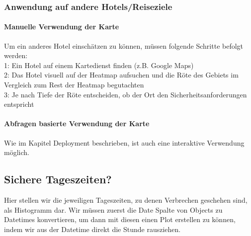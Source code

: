 \documentclass[10pt]{article}
\begin{document}
\subsubsection{Anwendung auf andere
Hotels/Reiseziele}\label{anwendung-auf-andere-hotelsreiseziele}

\paragraph{Manuelle Verwendung der
Karte}\label{manuelle-verwendung-der-karte}

Um ein anderes Hotel einschätzen zu können, müssen folgende Schritte
befolgt werden:\\
1: Ein Hotel auf einem Kartedienst finden (z.B. Google Maps)\\
2: Das Hotel visuell auf der Heatmap aufsuchen und die Röte des Gebiets
im Vergleich zum Rest der Heatmap begutachten\\
3: Je nach Tiefe der Röte entscheiden, ob der Ort den
Sicherheitsanforderungen entspricht

\paragraph{Abfragen basierte Verwendung der
Karte}\label{abfragen-basierte-verwendung-der-karte}

Wie im Kapitel Deployment beschrieben, ist auch eine interaktive
Verwendung möglich.

    \subsection{Sichere Tageszeiten?}\label{sichere-tageszeiten}

    Hier stellen wir die jeweiligen Tageszeiten, zu denen Verbrechen
geschehen sind, als Histogramm dar. Wir müssen zuerst die Date Spalte
von Objects zu Datetimes konvertieren, um dann mit diesen einen Plot
erstellen zu können, indem wir aus der Datetime direkt die Stunde
rausziehen.
\end{document}
